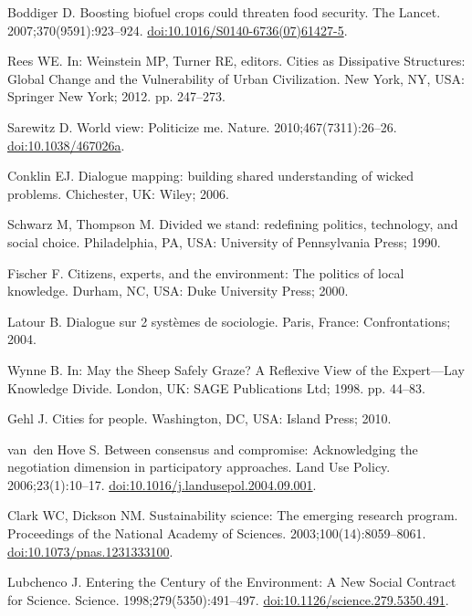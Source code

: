 \documentclass[10pt,a4paper]{article}
\begin{document}
\begin{multicols}{2}
\begin{footnotesize}
\begin{thebibliography}{100}
Boddiger D.
\newblock Boosting biofuel crops could threaten food security.
\newblock The Lancet. 2007;370(9591):923--924.
\newblock
  \href{https://doi.org/10.1016/S0140-6736(07)61427-5}{doi:10.1016/S0140-6736(07)61427-5}.

Rees WE.
\newblock In: Weinstein MP, Turner RE, editors. Cities as {Dissipative}
  {Structures}: {Global} {Change} and the {Vulnerability} of {Urban}
  {Civilization}. New York, NY, USA: Springer New York; 2012. pp. 247--273.

Sarewitz D.
\newblock World view: {Politicize} me.
\newblock Nature. 2010;467(7311):26--26.
\newblock \href{https://doi.org/10.1038/467026a}{doi:10.1038/467026a}.

Conklin EJ.
\newblock Dialogue mapping: building shared understanding of wicked problems.
\newblock Chichester, UK: Wiley; 2006.

Schwarz M, Thompson M.
\newblock Divided we stand: redefining politics, technology, and social choice.
\newblock Philadelphia, PA, USA: University of Pennsylvania Press; 1990.

Fischer F.
\newblock Citizens, experts, and the environment: The politics of local
  knowledge.
\newblock Durham, NC, USA: Duke University Press; 2000.

Latour B.
\newblock Dialogue sur 2 systèmes de sociologie.
\newblock Paris, France: Confrontations; 2004.

Wynne B.
\newblock In: May the {Sheep} {Safely} {Graze}? {A} {Reflexive} {View} of the
  {Expert}---{Lay} {Knowledge} {Divide}. London, UK: SAGE Publications Ltd;
  1998. pp. 44--83.

Gehl J.
\newblock Cities for people.
\newblock Washington, DC, USA: Island Press; 2010.

van~den Hove S.
\newblock Between consensus and compromise: Acknowledging the negotiation
  dimension in participatory approaches.
\newblock Land Use Policy. 2006;23(1):10--17.
\newblock
  \href{https://doi.org/10.1016/j.landusepol.2004.09.001}{doi:10.1016/j.landusepol.2004.09.001}.

Clark WC, Dickson NM.
\newblock Sustainability science: {The} emerging research program.
\newblock Proceedings of the National Academy of Sciences.
  2003;100(14):8059--8061.
\newblock
  \href{https://doi.org/10.1073/pnas.1231333100}{doi:10.1073/pnas.1231333100}.

Lubchenco J.
\newblock Entering the {Century} of the {Environment}: {A} {New} {Social}
  {Contract} for {Science}.
\newblock Science. 1998;279(5350):491--497.
\newblock
  \href{https://doi.org/10.1126/science.279.5350.491}{doi:10.1126/science.279.5350.491}.


\end{thebibliography}
\end{footnotesize}
\end{multicols}
\end{document}
